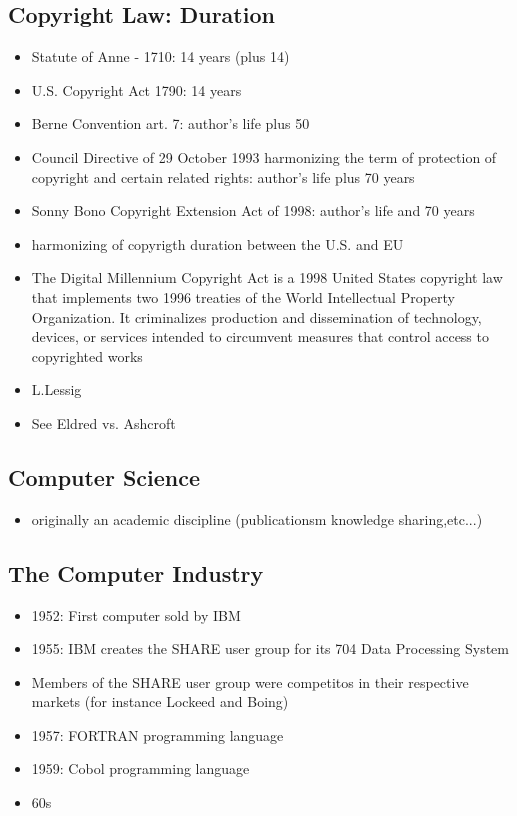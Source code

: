 \documentclass{article}
\begin{document}
\subsection{Copyright Law: Duration}
\begin{itemize}
\item Statute of Anne - 1710: 14 years (plus 14)
\item U.S. Copyright Act 1790: 14 years
\item Berne Convention art. 7: author's life plus 50
\item Council Directive of 29 October 1993 harmonizing the term of protection of copyright and certain related rights: author's life plus 70 years 
\item Sonny Bono Copyright Extension Act of 1998: author's life and 70 years 
\item harmonizing of copyrigth duration between the U.S. and EU
\item The Digital Millennium Copyright Act is a 1998 United States copyright law that implements two 1996 treaties of the World Intellectual Property Organization. It criminalizes production and dissemination of technology, devices, or services intended to circumvent measures that control access to copyrighted works
\item L.Lessig
\item See Eldred vs. Ashcroft 
\end{itemize}

\subsection{Computer Science}
\begin{itemize}
\item originally an academic discipline (publicationsm knowledge sharing,etc...)
\end{itemize}

\subsection{The Computer Industry}
\begin{itemize}
\item 1952: First computer sold by IBM
\item 1955: IBM creates the SHARE user group for its 704 Data Processing System
\item Members of the SHARE user group were competitos in their respective markets (for instance Lockeed and Boing)
\item 1957: FORTRAN programming language 
\item 1959: Cobol programming language 
\item 60s
\end{itemize}
\end{document}
